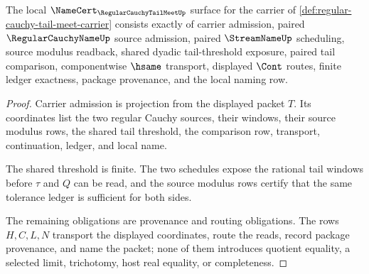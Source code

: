 \begin{theorem}
\label{thm:regular-cauchy-tail-meet-namecert-obligations}
The local $\NameCert_{\RegularCauchyTailMeetUp}$ surface for the carrier of \autoref{def:regular-cauchy-tail-meet-carrier} consists exactly of carrier admission, paired $\RegularCauchyNameUp$ source admission, paired $\StreamNameUp$ scheduling, source modulus readback, shared dyadic tail-threshold exposure, paired tail comparison, componentwise $\hsame$ transport, displayed $\Cont$ routes, finite ledger exactness, package provenance, and the local naming row.
\end{theorem}
\begin{proof}
Carrier admission is projection from the displayed packet $T$. Its coordinates list the two regular Cauchy sources, their windows, their source modulus rows, the shared tail threshold, the comparison row, transport, continuation, ledger, and local name.

The shared threshold is finite. The two schedules expose the rational tail windows before $\tau$ and $Q$ can be read, and the source modulus rows certify that the same tolerance ledger is sufficient for both sides.

The remaining obligations are provenance and routing obligations. The rows $H,C,L,N$ transport the displayed coordinates, route the reads, record package provenance, and name the packet; none of them introduces quotient equality, a selected limit, trichotomy, host real equality, or completeness.
\end{proof}

